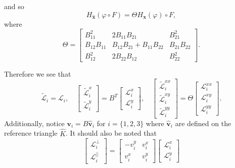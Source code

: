 and so
\begin{equation}
  H_{\mathbf{\hat{x}}}(\varphi\circ F) = \Theta H_{\mathbf{x}}(\varphi)\circ F,
  \label{eqn:Hessian}
\end{equation}
where
\begin{equation*}
  \Theta = \begin{bmatrix}
    B_{11}^2 & 2B_{11}B_{21} & B_{21}^2 \\[0.5em]
    B_{12}B_{11} & B_{12}B_{21} + B_{11}B_{22} & B_{21}B_{22} \\[0.5em]
    B_{12}^2 & 2B_{22}B_{12} & B_{22}^2
  \end{bmatrix}.
\end{equation*}

Therefore we see that
\begin{equation*}
  \tilde{\mathcal{L}}_i = \mathcal{L}_i, \quad
  \begin{bmatrix}
    \tilde{\mathcal{L}}^x_i \\ \tilde{\mathcal{L}}^y_i
  \end{bmatrix} = B^T \begin{bmatrix}
    \mathcal{L}^x_i \\ \mathcal{L}^y_i
  \end{bmatrix}, \quad
  \begin{bmatrix}
    \tilde{\mathcal{L}}^{xx}_i \\ \tilde{\mathcal{L}}^{xy}_i \\ \tilde{\mathcal{L}}^{yy}_i
  \end{bmatrix} = \Theta \begin{bmatrix}
    \mathcal{L}^{xx}_i \\ \mathcal{L}^{xy}_i \\ \mathcal{L}^{yy}_i
  \end{bmatrix}.
\end{equation*}
Additionally, notice $\mathbf{v}_i = B\hat{\mathbf{v}}_i$ for
$i=\{1,2,3\}$ where $\hat{\mathbf{v}}_i$ are defined on the reference triangle
$\hat{K}$. It should also be noted that
\begin{equation*}
  \begin{bmatrix}
    \mathcal{L}^{\perp}_i \\ \mathcal{L}^{||}_i
  \end{bmatrix} = \begin{bmatrix} -v^y_i & v^x_i \\ v^x_i & v^y_i \end{bmatrix}
  \begin{bmatrix}
    \mathcal{L}^x_i \\ \mathcal{L}^y_i
  \end{bmatrix}
\end{equation*}
